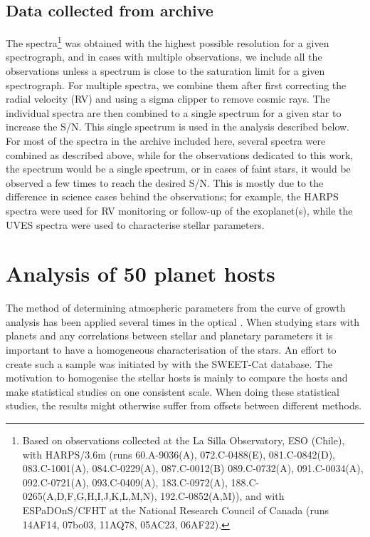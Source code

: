\subsection{Data collected from archive}

The spectra\footnote{Based on observations collected at the La Silla Observatory, ESO (Chile), with
HARPS/3.6m (runs 60.A-9036(A), 072.C-0488(E), 081.C-0842(D), 083.C-1001(A), 084.C-0229(A),
087.C-0012(B) 089.C-0732(A), 091.C-0034(A), 092.C-0721(A), 093.C-0409(A), 183.C-0972(A),
188.C-0265(A,D,F,G,H,I,J,K,L,M,N), 192.C-0852(A,M)), and with ESPaDOnS/CFHT at the National Research
Council of Canada (runs 14AF14, 07bo03, 11AQ78, 05AC23, 06AF22).} was obtained with the highest
possible resolution for a given spectrograph, and in cases with multiple observations, we include
all the observations unless a spectrum is close to the saturation limit for a given spectrograph.
For multiple spectra, we combine them after first correcting the radial velocity (RV) and using a
sigma clipper to remove cosmic rays. The individual spectra are then combined to a single spectrum
for a given star to increase the S/N. This single spectrum is used in the analysis described below.
For most of the spectra in the archive included here, several spectra were combined as described
above, while for the observations dedicated to this work, the spectrum would be a single spectrum,
or in cases of faint stars, it would be observed a few times to reach the desired S/N. This is
mostly due to the difference in science cases behind the observations; for example, the HARPS
spectra were used for RV monitoring or follow-up of the exoplanet(s), while the UVES spectra were
used to characterise stellar parameters. 

\section{Analysis of 50 planet hosts}
\label{sec:sweetcat_analysis}

The method of determining atmospheric parameters from the curve of growth analysis has been applied
several times in the optical \citep[see e.g.][]{Mortier2013b,Tsantaki2013,Sousa2011,Santos2013}.
When studying stars with planets and any correlations between stellar and planetary parameters it is
important to have a homogeneous characterisation of the stars. An effort to create such a sample was
initiated by \citet{Santos2013} with the SWEET-Cat database. The motivation to homogenise the
stellar hosts is mainly to compare the hosts and make statistical studies on one consistent scale.
When doing these statistical studies, the results might otherwise suffer from offsets between
different methods.

